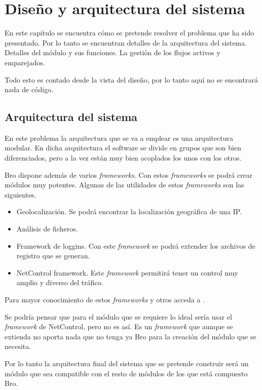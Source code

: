 \chapter{Diseño y arquitectura del sistema}

En este capítulo se encuentra cómo se pretende resolver el problema que ha sido presentado. Por lo tanto 
se encuentran detalles de la arquitectura del sistema. Detalles del módulo y sus funciones. La gestión de 
los flujos activos y emparejados.

\intro Todo esto es contado desde la vista del diseño, por lo tanto aquí no se encontrará nada de código.

\section{Arquitectura del sistema}

En este problema la arquitectura que se va a emplear es una arquitectura modular. En dicha arquitectura el software 
se divide en grupos que son bien diferenciados, pero a la vez están muy bien acoplados los unos con los otros.

\intro Bro dispone además de varios \textit{frameworks}. Con estos \textit{frameworks} se podrá crear módulos muy 
potentes. Algunas de las utilidades de estos \textit{frameworks} son las siguientes.
\begin{itemize}
\item Geolocalización. Se podrá encontrar la localización geográfica de una IP.
\item Análisis de ficheros. 
\item Framework de loggins. Con este \textit{framework} se podrá extender los archivos de registro que se generan.
\item NetControl framework. Este \textit{framework} permitirá tener un control muy amplio y diverso del tráfico.
\end{itemize}

\intro Para mayor conocimiento de estos \textit{frameworks} y otros acceda a \cite{broframeworks}.

\intro Se podría pensar que para el módulo que se requiere lo ideal sería usar el \textit{framework} de NetControl, 
pero no es así. Es un \textit{framework} que aunque se extienda no aporta nada que no tenga ya Bro para la creación 
del módulo que se necesita.

\intro Por lo tanto la arquitectura final del sistema que se pretende construir será un módulo que sea compatible 
con el resto de módulos de los que está compuesto Bro.

